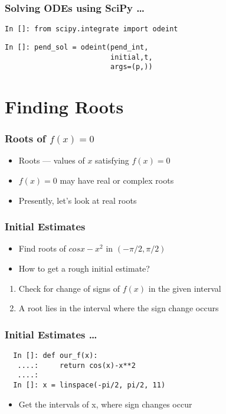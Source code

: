 \documentclass[14pt,compress]{beamer}
\newcommand{\typ}[1]{\lstinline{#1}}
\begin{document}
\begin{frame}[fragile]
\frametitle{Solving ODEs using SciPy \ldots}
\begin{small}
  \typ{In []: from scipy.integrate import odeint}
\end{small}
\begin{lstlisting}
In []: pend_sol = odeint(pend_int, 
                         initial,t, 
                         args=(p,))
\end{lstlisting}
\end{frame}

\section{Finding Roots}

\begin{frame}[fragile]
\frametitle{Roots of $f(x)=0$}
\begin{itemize}
\item Roots --- values of $x$ satisfying $f(x)=0$
\item $f(x)=0$ may have real or complex roots
\item Presently, let's look at real roots
\end{itemize}
\end{frame}

\begin{frame}[fragile]
\frametitle{Initial Estimates}
\begin{itemize}
\item Find roots of $cosx-x^2$ in $(-\pi/2, \pi/2)$
\item How to get a rough initial estimate?
\end{itemize}
\begin{enumerate}
\item Check for change of signs of $f(x)$ in the given interval
\item A root lies in the interval where the sign change occurs
\end{enumerate}
\end{frame}

\begin{frame}[fragile]
\frametitle{Initial Estimates \ldots}
\begin{lstlisting}
  In []: def our_f(x):
   ....:     return cos(x)-x**2
   ....: 
  In []: x = linspace(-pi/2, pi/2, 11)
\end{lstlisting}
\begin{itemize}
\item Get the intervals of x, where sign changes occur
\end{itemize}
\end{frame}
\end{document}
